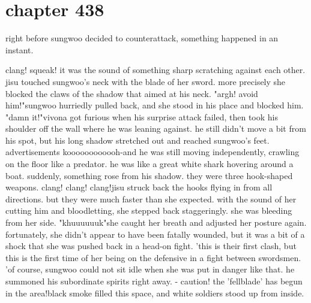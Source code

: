 \section{chapter 438}

right before sungwoo decided to counterattack, something happened in an instant.





clang! squeak! it was the sound of something sharp scratching against each other.
jisu touched sungwoo's neck with the blade of her sword.
 more precisely she blocked the claws of the shadow that aimed at his neck.
"argh! avoid him!"sungwoo hurriedly pulled back, and she stood in his place and blocked him.
"damn it!"vivona got furious when his surprise attack failed, then took his shoulder off the wall where he was leaning against.
 he still didn't move a bit from his spot, but his long shadow stretched out and reached sungwoo's feet.
advertisements    koooooooooooh-and he was still moving independently, crawling on the floor like a predator.
 he was like a great white shark hovering around a boat.
 suddenly, something rose from his shadow.
 they were three hook-shaped weapons.
clang! clang! clang!jisu struck back the hooks flying in from all directions.
 but they were much faster than she expected.
with the sound of her cutting him and bloodletting, she stepped back staggeringly.
 she was bleeding from her side.
"khuuuuuuk"she caught her breath and adjusted her posture again.
 fortunately, she didn't appear to have been fatally wounded, but it was a bit of a shock that she was pushed back in a head-on fight.
'this is their first clash, but this is the first time of her being on the defensive in a fight between swordsmen.
'of course, sungwoo could not sit idle when she was put in danger like that.
 he summoned his subordinate spirits right away.
- caution! the 'fellblade' has begun in the area!black smoke filled this space, and white soldiers stood up from inside.

